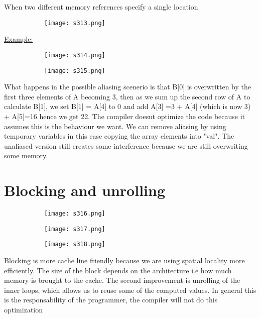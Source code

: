 \documentclass[8pt]{extreport}
\begin{document}
When two different memory references specify a single location
\begin{figure}[H]
\centering
\begin{subfigure}[b]{0.4\linewidth}
\texttt{[image: s313.png]}
\end{subfigure}
\end{figure}
\underline{Example:}
\begin{figure}[H]
\centering
\begin{subfigure}[b]{0.4\linewidth}
\texttt{[image: s314.png]}
\end{subfigure}
\begin{subfigure}[b]{0.4\linewidth}
\texttt{[image: s315.png]}
\end{subfigure}
\end{figure}
What happens in the possible aliasing scenerio is that B[0] is overwritten by the first three elements of A becoming 3, then as we sum up the second row of A to calculate B[1], we set B[1] = A[4] to 0 and add A[3] =3 + A[4] (which is now 3) + A[5]=16 hence we get 22. The compiler doesnt optimize the code because it assumes this is the behaviour we want. We can remove aliasing by using temporary variables in this case copying the array elements into "val". The unaliased version still creates some interference because we are still overwriting some memory.

\section{Blocking and unrolling}
\begin{figure}[H]
\centering
\begin{subfigure}[b]{0.4\linewidth}
\texttt{[image: s316.png]}
\end{subfigure}
\begin{subfigure}[b]{0.4\linewidth}
\texttt{[image: s317.png]}
\end{subfigure}
\begin{subfigure}[b]{0.4\linewidth}
\texttt{[image: s318.png]}
\end{subfigure}
\end{figure}
Blocking is more cache line friendly because we are using spatial locality more efficiently. The size of the block depends on the architecture i.e how much memory is brought to the cache. The second improvement is unrolling of the inner loops, which allows us to reuse some of the computed values. In general this is the responsability of the programmer, the compiler will not do this optimization
\end{document}
